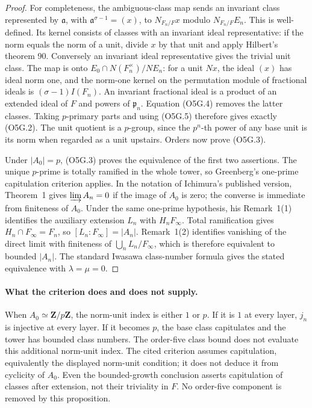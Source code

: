\begin{proof}
For completeness, the ambiguous-class map sends an invariant
class represented by $\mathfrak a$, with
$\mathfrak a^{\sigma-1}=(x)$, to $N_{F_n/F}x$ modulo
$N_{F_n/F}E_n$.  This is well-defined.  Its kernel consists
of classes with an invariant ideal representative: if the
norm equals the norm of a unit, divide $x$ by that unit and
apply Hilbert's theorem 90.  Conversely an invariant ideal
representative gives the trivial unit class.
The map is onto $E_0\cap N(F_n^{\times})/N E_n$:
for a unit $N x$, the ideal $(x)$ has ideal norm one, and the
norm-one kernel on the permutation module of fractional ideals
is $(\sigma-1)I(F_n)$.
An invariant fractional ideal is a product of an extended ideal
of $F$ and powers of $\mathfrak p_n$.  Equation (O5G.4) removes
the latter classes.  Taking $p$-primary parts and using (O5G.5)
therefore gives exactly (O5G.2).  The unit quotient is a
$p$-group, since the $p^n$-th power of any base unit is its norm
when regarded as a unit upstairs.  Orders now prove (O5G.3).

Under $|A_0|=p$, (O5G.3) proves the equivalence of the first
two assertions.  The unique $p$-prime is totally ramified in
the whole tower, so Greenberg's one-prime capitulation criterion
applies.  In the notation of Ichimura's published version,
Theorem~1 gives $\varinjlim A_n=0$ if the image of $A_0$ is zero;
the converse is immediate from finiteness of $A_0$.
Under the same one-prime hypothesis, his Remark~1(1) identifies
the auxiliary extension $L_n$ with $H_nF_\infty$.
Total ramification gives $H_n\cap F_\infty=F_n$, so
$[L_n:F_\infty]=|A_n|$.  Remark~1(2) identifies vanishing of
the direct limit with finiteness of $\bigcup_nL_n/F_\infty$,
which is therefore equivalent to bounded $|A_n|$.
The standard Iwasawa class-number formula gives the stated
equivalence with $\lambda=\mu=0$.
\end{proof}

\paragraph{What the criterion does and does not supply.}
When $A_0\simeq\mathbf Z/p\mathbf Z$, the norm-unit index is
either $1$ or $p$.  If it is $1$ at every layer, $j_n$ is
injective at every layer.  If it becomes $p$, the base class
capitulates and the tower has bounded class numbers.
The order-five class bound does not evaluate this additional
norm-unit index.  The cited criterion assumes capitulation,
equivalently the displayed norm-unit condition; it does not
deduce it from cyclicity of $A_0$.
Even the bounded-growth conclusion asserts capitulation of
classes after extension, not their triviality in $F$.
No order-five component is removed by this proposition.


